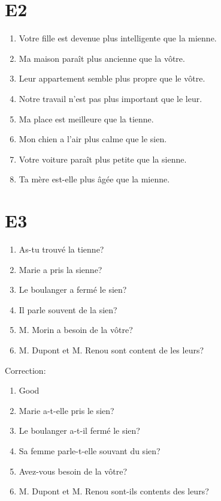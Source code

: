 \documentclass{book}
\begin{document}
    \section{E2}
        \begin{enumerate}
            \item Votre fille est devenue plus intelligente que la mienne.
            \item Ma maison paraît plus ancienne que la vôtre.
            \item Leur appartement semble plus propre que le vôtre.
            \item Notre travail n'est pas plus important que le leur.
            \item Ma place est meilleure que la tienne.
            \item Mon chien a l'air plus calme que le sien.
            \item Votre voiture paraît plus petite que la sienne.
            \item Ta mère est-elle plus âgée que la mienne.
        \end{enumerate}
        
    \section{E3}
        \begin{enumerate}
            \item As-tu trouvé la tienne?
            \item Marie a pris la sienne?
            \item Le boulanger a fermé le sien?
            \item Il parle souvent de la sien?
            \item M. Morin a besoin de la vôtre?
            \item M. Dupont et M. Renou sont content de les leurs?
        \end{enumerate}
        Correction:
        \begin{enumerate}
            \item Good
            \item Marie a-t-elle pris le sien?
            \item Le boulanger a-t-il fermé le sien?
            \item Sa femme parle-t-elle souvant du sien?
            \item Avez-vous besoin de la vôtre?
            \item M. Dupont et M. Renou sont-ils contents des leurs?
        \end{enumerate}
\end{document}
